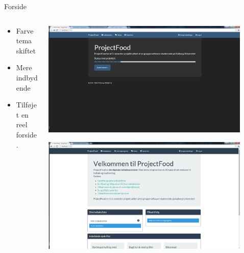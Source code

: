 \begin{frame}{Forside}
	
	\begin{minipage}[0.3\textheight]{\textwidth}
	\begin{columns}[T]
	\begin{column}{0.5\textwidth}
	\begin{itemize}
	\item Farve tema skiftet
	\item Mere indbydende
	\item Tilføjet en reel forside.
	
	\end{itemize}
	\end{column}
	\begin{column}{0.5\textwidth}
	 \includegraphics[width=0.9\textwidth,height=0.8\textheight,keepaspectratio]{images/Screenshots/FrontPageOld.png}
	 
	 \vspace{2 mm}
	  
	  \includegraphics[width=0.9\textwidth,height=0.8\textheight,keepaspectratio]{images/Screenshots/FrontPage.png}
	\end{column}
	\end{columns}
	

  \end{minipage}
	
\end{frame}

